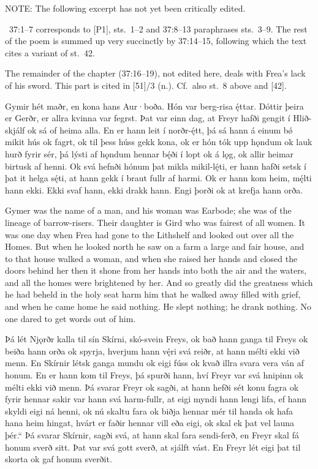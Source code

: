 NOTE: The following excerpt has not yet been critically edited.%

\Gylfaginning~37:1--7 corresponds to [P1], sts.~1--2 and 37:8--13 paraphrases sts.~3--9.  The rest of the poem is summed up very succinctly by 37:14--15, following which the text cites a variant of st.~42.

The remainder of the chapter (37:16--19), not edited here, deals with Frea’s lack of his sword.  This part is cited in [51]/3 (n.).  Cf.~also st.~8 above and [42].

\bpg\bpa[0]%
\pva Gymir hét maðr, en kona hans Aur·boða. Hón var berg-risa ę́ttar.
\pva Dóttir þeira er Gerðr, er allra kvinna var fegrst.
\pva Þat var einn dag, at Freyr hafði gengit í Hlið-skjálf ok sá of heima alla.
\pva En er hann leit í norðr-ę́tt, þá sá hann á einum bǿ mikit hús ok fagrt, ok til þess húss gekk kona,
\pva ok er hón tók upp hǫndum ok lauk hurð fyrir sér, þá lýsti af hǫndum hennar bę́ði í lopt ok á lǫg, ok allir heimar birtusk af henni.
\pva Ok svá hefnði hónum þat mikla mikil-lę́ti, er hann hafði setsk í þat it helga sę́ti, at hann gekk í braut fullr af harmi.
\pva Ok er hann kom heim, mę́lti hann ekki. Ekki svaf hann, ekki drakk hann. Engi þorði ok at krefja hann orða.\epa

\bpb\pvb Gymer was the name of a man, and his woman was Earbode; she was of the lineage of barrow-risers.
\pvb Their daughter is Gird who was fairest of all women.
\pvb It was one day when Frea had gone to the Lithshelf and looked out over all the Homes.
\pvb But when he looked north he saw on a farm a large and fair house, and to that house walked a woman,
\pvb and when she raised her hands and closed the doors behind her then it shone from her hands into both the air and the waters, and all the homes were brightened by her.
\pvb And so greatly did the greatness which he had beheld in the holy seat harm him that he walked away filled with grief,
\pvb and when he came home he said nothing.  He slept nothing; he drank nothing.  No one dared to get words out of him.\epb\epg


\bpg\bpa[0]\pva[8]%
Þá lét Njǫrðr kalla til sín Skírni, skó-svein Freys, ok bað hann ganga til Freys ok beiða hann orða ok spyrja, hverjum hann vę́ri svá reiðr, at hann mélti ekki við menn.
\pva En Skírnir létsk ganga mundu ok eigi fúss ok kvað illra svara vera ván af honum.
\pva En er hann kom til Freys, þá spurði hann, hví Freyr var svá hnipinn ok mélti ekki við menn.
\pva Þá svarar Freyr ok sagði, at hann hefði sét konu fagra ok fyrir hennar sakir var hann svá harm-fullr, at eigi myndi hann lengi lifa, ef hann skyldi eigi ná henni,
\pva {}ok nú skaltu fara ok biðja hennar mér til handa ok hafa hana heim hingat, hvárt er faðir hennar vill eða eigi, ok skal ek þat vel launa þér.“
\pva Þá svarar Skírnir, sagði svá, at hann skal fara sendi-ferð, en Freyr skal fá honum sverð sitt. Þat var svá gott sverð, at sjálft vást. En Freyr lét eigi þat til skorta ok gaf honum sverðit.\epa

